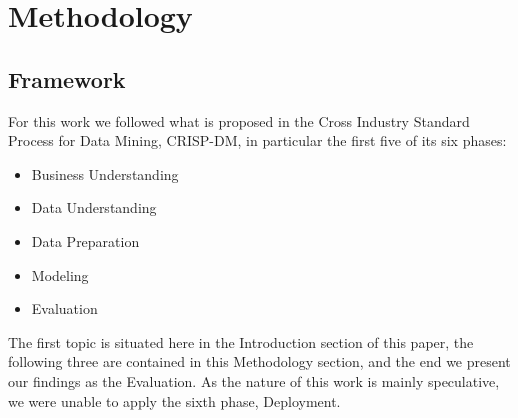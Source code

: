 \documentclass[conference]{IEEEtran}
\begin{document}



\section{Methodology}
\subsection{Framework}
For this work we followed what is proposed in the Cross Industry Standard Process for Data Mining, CRISP-DM, in particular the first five of its six phases:

\begin{itemize}
    \item Business Understanding
    \item Data Understanding
    \item Data Preparation
    \item Modeling
    \item Evaluation
\end{itemize}

The first topic is situated here in the Introduction section of this paper, the following three are contained in this Methodology section, and the end we present our findings as the Evaluation. As the nature of this work is mainly speculative, we were unable to apply the sixth phase, Deployment.
\end{document}
